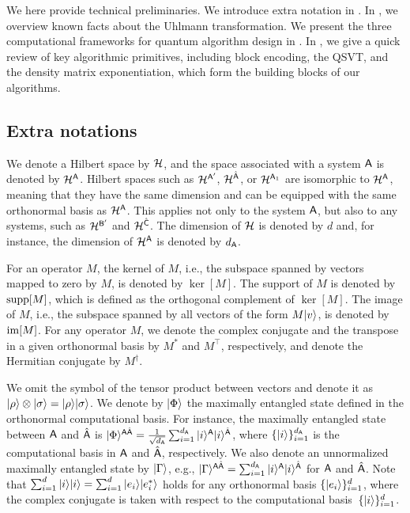




We here provide technical preliminaries.
We introduce extra notation in . In , we overview known facts about the Uhlmann transformation.
We present the three computational frameworks for quantum algorithm design in .
In , we give a quick review of key algorithmic primitives, including block encoding, the QSVT, and the density matrix exponentiation, which form the building blocks of our algorithms.



\subsection{Extra notations}
\label{sec:notation}


We denote a Hilbert space by ${\mathcal{H}}$, and the space associated with a system ${\mathsf{A}}$ is denoted by ${\mathcal{H}}^{\mathsf{A}}$. Hilbert spaces such as ${\mathcal{H}}^{{\mathsf{A}}'}$, ${\mathcal{H}}^{\hat{{\mathsf{A}}}}$, or ${\mathcal{H}}^{{\mathsf{A}}_1}$ are isomorphic to ${\mathcal{H}}^{\mathsf{A}}$, meaning that they have the same dimension and can be equipped with the same orthonormal basis as ${\mathcal{H}}^{\mathsf{A}}$.
This applies not only to the system ${\mathsf{A}}$, but also to any systems, such as ${\mathcal{H}}^{{\mathsf{B}}'}$ and ${\mathcal{H}}^{\hat{{\mathsf{C}}}}$. The dimension of ${\mathcal{H}}$ is denoted by $d$ and, for instance, the dimension of ${\mathcal{H}}^{\mathsf{A}}$ is denoted by $d_{\mathsf{A}}$. 




For an operator $M$, the kernel of $M$, i.e., the subspace spanned by vectors mapped to zero by $M$, is denoted by $\ker[M]$. The support of $M$ is denoted by $\mathrm{supp}[M]$, which is defined as the orthogonal complement of $\ker[M]$.
The image of $M$, i.e., the subspace spanned by all vectors of the form $M|v\rangle$, is denoted by $\mathrm{im}[M]$.
For any operator $M$, we denote the complex conjugate and the transpose in a given orthonormal basis by $M^*$ and $M^\top$, respectively, and denote the Hermitian conjugate by $M^\dag$. 





We omit the symbol of the tensor product between vectors and denote it as $|\rho\rangle\otimes|\sigma\rangle = |\rho\rangle|\sigma\rangle$.
We denote by $|\Phi\rangle$ the maximally entangled state defined in the orthonormal computational basis. For instance, the maximally entangled state between ${\mathsf{A}}$ and $\hat{{\mathsf{A}}}$ is $|\Phi\rangle^{{\mathsf{A}}\hat{{\mathsf{A}}}} = \frac{1}{\sqrt{d_{\mathsf{A}}}}\sum_{i=1}^{d_{\mathsf{A}}}|i\rangle^{\mathsf{A}}|i\rangle^{\hat{{\mathsf{A}}}}$, where $\{|i\rangle\}_{i=1}^{d_{\mathsf{A}}}$ is the computational basis in ${\mathsf{A}}$ and $\hat{{\mathsf{A}}}$, respectively. 
We also denote an unnormalized maximally entangled state by $|\Gamma\rangle$, e.g., $|\Gamma\rangle^{{\mathsf{A}}\hat{{\mathsf{A}}}} = \sum_{i=1}^{d_{\mathsf{A}}}|i\rangle^{\mathsf{A}}|i\rangle^{\hat{{\mathsf{A}}}}$ for ${\mathsf{A}}$ and $\hat{{\mathsf{A}}}$.
Note that $\sum_{i=1}^d|i\rangle|i\rangle = \sum_{i=1}^d|e_i\rangle|e_i^*\rangle$ holds for any orthonormal basis $\{|e_i\rangle\}_{i=1}^d$, where the complex conjugate is taken with respect to the computational basis~$\{|i\rangle\}_{i=1}^d$.


